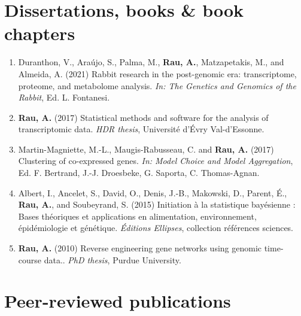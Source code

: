 \documentclass[11pt, a4paper]{awesome-cv}
\providecommand{\tightlist}{%
	\setlength{\itemsep}{0pt}\setlength{\parskip}{0pt}}
\begin{document}
\begin{cvhonors}
\end{cvhonors}

\hypertarget{dissertations-books-book-chapters}{%
\section{Dissertations, books \& book
chapters}\label{dissertations-books-book-chapters}}

\begin{enumerate}
\def\labelenumi{\arabic{enumi}.}
\tightlist
\item
  Duranthon, V., Araújo, S., Palma, M., \textbf{Rau, A.}, Matzapetakis,
  M., and Almeida, A. (2021) Rabbit research in the post-genomic era:
  transcriptome, proteome, and metabolome analysis. \emph{In: The
  Genetics and Genomics of the Rabbit}, Ed. L. Fontanesi.
\item
  \textbf{Rau, A.} (2017) Statistical methods and software for the
  analysis of transcriptomic data. \emph{HDR thesis}, Université d'Évry
  Val-d'Essonne.
\item
  Martin-Magniette, M.-L., Maugis-Rabusseau, C. and \textbf{Rau, A.}
  (2017) Clustering of co-expressed genes. \emph{In: Model Choice and
  Model Aggregation}, Ed. F. Bertrand, J.-J. Droesbeke, G. Saporta, C.
  Thomas-Agnan.
\item
  Albert, I., Ancelet, S., David, O., Denis, J.-B., Makowski, D.,
  Parent, É., \textbf{Rau, A.}, and Soubeyrand, S. (2015) Initiation à
  la statistique bayésienne : Bases théoriques et applications en
  alimentation, environnement, épidémiologie et génétique.
  \emph{Éditions Ellipses}, collection références sciences.
\item
  \textbf{Rau, A.} (2010) Reverse engineering gene networks using
  genomic time-course data.. \emph{PhD thesis}, Purdue University.
\end{enumerate}

\hypertarget{peer-reviewed-publications}{%
\section{Peer-reviewed publications}\label{peer-reviewed-publications}}
\end{document}
